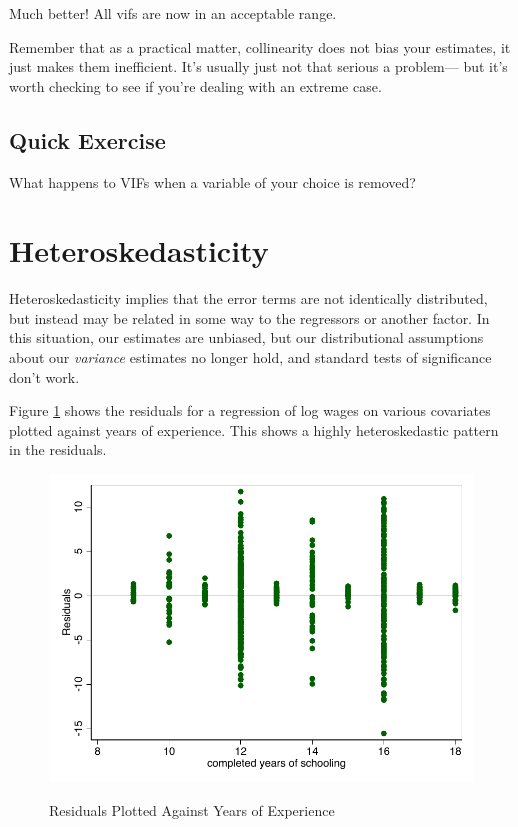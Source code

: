 \documentclass[12pt]{article}
\begin{document}
Much better! All vifs are now in an acceptable range. 

Remember that as a practical matter, collinearity does not bias your
estimates, it just makes them inefficient. It's usually just not that
serious a problem--- but it's worth checking to see if you're dealing
with an extreme case. 

\subsection{Quick Exercise}
\label{sec:quick-exercise}

What happens to VIFs when a variable of your choice is removed? 

\section{Heteroskedasticity}
\label{sec:heteroskedasticity}

Heteroskedasticity implies that the error terms are not identically
distributed, but instead may be related in some way to the regressors
or another factor. In this situation, our estimates are unbiased, but
our distributional assumptions about our \textit{variance} estimates
no longer hold, and standard tests of significance don't work. 

Figure \ref{fig:residplot1} shows the residuals for a regression of
log wages on various covariates plotted against years of
experience. This shows a highly heteroskedastic pattern in the
residuals. 

\begin{figure}[ht!]
  \centering
  \caption{Residuals Plotted Against Years of Experience}
\includegraphics{het_results}
  \label{fig:residplot1}
\end{figure}
\end{document}
